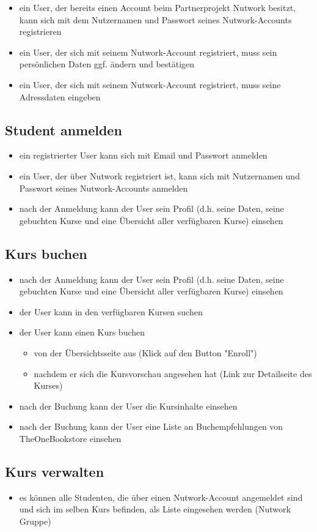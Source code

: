 \documentclass{article}
\begin{document}
\begin{itemize}
\item ein User, der bereits einen Account beim Partnerprojekt Nutwork besitzt, kann sich mit dem Nutzernamen und Passwort seines Nutwork-Accounts registrieren
\item ein User, der sich mit seinem Nutwork-Account registriert, muss sein pers\"onlichen Daten ggf. \"andern und best\"atigen
\item ein User, der sich mit seinem Nutwork-Account registriert, muss seine Adressdaten eingeben
\end{itemize}

\subsection{Student anmelden}

\begin{itemize}
\item ein registrierter User kann sich mit Email und Passwort anmelden
\item ein User, der \"uber Nutwork registriert ist, kann sich mit Nutzernamen und Passwort seines Nutwork-Accounts anmelden
\item nach der Anmeldung kann der User sein Profil (d.h. seine Daten, seine gebuchten Kurse und eine \"Ubersicht aller verf\"ugbaren Kurse) einsehen
\end{itemize}

\subsection{Kurs buchen}

\begin{itemize}
\item nach der Anmeldung kann der User sein Profil (d.h. seine Daten, seine gebuchten Kurse und eine \"Ubersicht aller verf\"ugbaren Kurse) einsehen
\item der User kann in den verf\"ugbaren Kursen suchen
\item der User kann einen Kurs buchen
	\begin{itemize}
	\item von der \"Ubersichtsseite aus (Klick auf den Button "Enroll")
	\item nachdem er sich die Kursvorschau angesehen hat (Link zur Detailseite des Kurses)
	\end{itemize}
\item nach der Buchung kann der User die Kursinhalte einsehen
\item nach der Buchung kann der User eine Liste an Buchempfehlungen von TheOneBookstore einsehen
\end{itemize}

\subsection{Kurs verwalten}

\begin{itemize}
\item es k\"onnen alle Studenten, die \"uber einen Nutwork-Account angemeldet sind und sich im selben Kurs befinden, als Liste eingesehen werden (Nutwork Gruppe)
\end{itemize}
\end{document}
